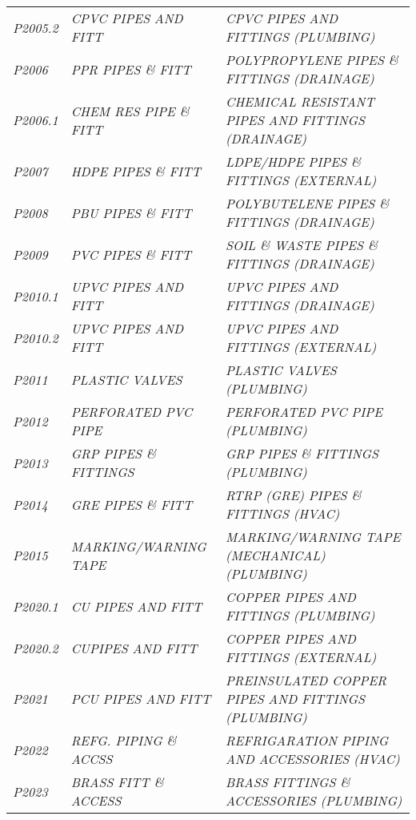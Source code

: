 \begin{landscape}
\begin{longtable}[l]{l%
                  l|%
                  l|}
\itshape P2005.2     &\itshape CPVC PIPES AND FITT   &\itshape CPVC PIPES AND FITTINGS (PLUMBING)   \\
\itshape P2006       &\itshape PPR PIPES \& FITT   &\itshape POLYPROPYLENE PIPES \& FITTINGS (DRAINAGE)   \\
\itshape P2006.1     &\itshape CHEM RES PIPE \& FITT   &\itshape CHEMICAL RESISTANT PIPES AND FITTINGS (DRAINAGE)   \\
\itshape P2007       &\itshape HDPE PIPES \& FITT   &\itshape LDPE/HDPE PIPES \& FITTINGS (EXTERNAL)   \\
\itshape P2008       &\itshape PBU PIPES \& FITT   &\itshape POLYBUTELENE PIPES \& FITTINGS (DRAINAGE)   \\
\itshape P2009       &\itshape PVC PIPES \& FITT   &\itshape SOIL \& WASTE PIPES \& FITTINGS (DRAINAGE)   \\
\itshape P2010.1     &\itshape UPVC PIPES AND FITT   &\itshape UPVC PIPES AND FITTINGS  (DRAINAGE)   \\
\itshape P2010.2     &\itshape UPVC PIPES AND FITT   &\itshape UPVC PIPES AND FITTINGS (EXTERNAL)   \\
\itshape P2011       &\itshape PLASTIC VALVES   &\itshape PLASTIC VALVES (PLUMBING)   \\
\itshape P2012       &\itshape PERFORATED PVC PIPE   &\itshape PERFORATED PVC PIPE (PLUMBING)   \\
\itshape P2013       &\itshape GRP PIPES \& FITTINGS   &\itshape GRP PIPES \& FITTINGS (PLUMBING)   \\
\itshape P2014       &\itshape GRE PIPES \& FITT   &\itshape RTRP (GRE) PIPES \& FITTINGS (HVAC)   \\
\itshape P2015       &\itshape MARKING/WARNING TAPE   &\itshape MARKING/WARNING TAPE (MECHANICAL) (PLUMBING)   \\
\itshape P2020.1     &\itshape CU PIPES AND FITT   &\itshape COPPER PIPES AND FITTINGS (PLUMBING)   \\
\itshape P2020.2     &\itshape CUPIPES AND FITT   &\itshape COPPER PIPES AND FITTINGS (EXTERNAL)   \\
\itshape P2021       &\itshape PCU PIPES AND FITT   &\itshape PREINSULATED COPPER PIPES AND FITTINGS (PLUMBING)   \\
\itshape P2022       &\itshape REFG. PIPING \& ACCSS   &\itshape REFRIGARATION PIPING AND ACCESSORIES (HVAC)   \\
\itshape P2023       &\itshape BRASS FITT \& ACCESS   &\itshape BRASS FITTINGS \& ACCESSORIES (PLUMBING)   \\

\end{longtable}
\end{landscape}
